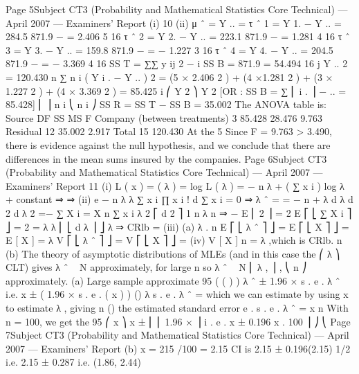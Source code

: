 Page 5Subject CT3 (Probability and Mathematical Statistics Core Technical) — April 2007 — Examiners’ Report
(i)
10
(ii)
μ ˆ = Y .. =
τ ˆ 1 = Y 1. − Y .. = 284.5 871.9
−
= 2.406
5
16
τ ˆ 2 = Y 2. − Y .. = 223.1 871.9
−
= 1.281
4
16
τ ˆ 3 = Y 3. − Y .. = 159.8 871.9
−
= − 1.227
3
16
τ ˆ 4 = Y 4. − Y .. = 204.5 871.9
−
= − 3.369
4
16
SS T = ∑∑ y ij 2 −
i
SS B =
871.9
= 54.494
16
j
Y .. 2
= 120.430
n
∑ n i ( Y i . − Y .. ) 2 = (5 × 2.406 2 ) + (4 ×1.281 2 ) + (3 × 1.227 2 ) + (4 × 3.369 2 ) = 85.425
i
⎛ Y 2 ⎞ Y 2
[OR : SS B = ∑ ⎜ i . ⎟ − .. = 85.428]
⎜
⎟ n
i ⎝ n i ⎠
SS R = SS T − SS B = 35.002
The ANOVA table is:
Source
DF
SS
MS
F
Company (between treatments) 3
85.428 28.476 9.763
Residual
12 35.002 2.917
Total
15 120.430
At the 5%
Since F = 9.763 > 3.490, there is evidence against the null hypothesis, and we
conclude that there are differences in the mean sums insured by the
companies.
Page 6Subject CT3 (Probability and Mathematical Statistics Core Technical) — April 2007 — Examiners’ Report
11
(i)
L ( x ) =
( λ ) = log L ( λ ) = − n λ + ( ∑ x i ) log λ + constant
⇒
⇒
(ii)
e − n λ λ ∑ x i
∏ x i !
d
∑ x i = 0 ⇒ λ ˆ =
= − n +
λ
d λ
d 2
d λ 2
=−
∑ X i = X
n
∑ x i
λ 2
⎡ d 2 ⎤ 1
n λ n
⇒ − E ⎢ 2 ⎥ = 2 E ⎡ ⎣ ∑ X i ⎤ ⎦ = 2 =
λ
λ
⎢ ⎣ d λ ⎥ ⎦ λ
⇒ CRlb =
(iii)
(a)
λ
.
n
E ⎡ ⎣ λ ˆ ⎤ ⎦ = E ⎡ ⎣ X ⎤ ⎦ = E [ X ] = λ
V ⎡ ⎣ λ ˆ ⎤ ⎦ = V ⎡ ⎣ X ⎤ ⎦ =
(iv)
V [ X ]
n
=
λ
,which is CRlb.
n
(b) The theory of asymptotic distributions of MLEs (and in this case the
⎛ λ ⎞
CLT) gives λ ˆ ~ N approximately, for large n so λ ˆ ~ N ⎜ λ , ⎟ ,
⎝ n ⎠
approximately.
(a) Large sample approximate 95%
(
( ) )
λ ˆ ± 1.96 × s . e . λ ˆ
i.e. x ± ( 1.96 × s . e . ( x ) )
()
λ
s . e . λ ˆ =
which we can estimate by using x to estimate λ , giving
n
()
the estimated standard error e . s . e . λ ˆ =
x
n
With n = 100, we get the 95%
⎛
x ⎞
x ± ⎜ ⎜ 1.96 ×
⎟ i . e . x ± 0.196 x .
100 ⎟ ⎠
⎝
Page 7Subject CT3 (Probability and Mathematical Statistics Core Technical) — April 2007 — Examiners’ Report
(b)
x = 215 /100 = 2.15
CI is 2.15 ± 0.196(2.15) 1/2 i.e. 2.15 ± 0.287 i.e. (1.86, 2.44)
